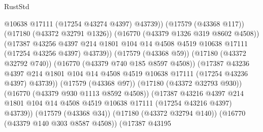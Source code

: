 \begin{lexlean}{RustStd}
\begin{coremodule}
{\begin{coremodule}
{{{{{{{{{{{{{{{{{{{{{{{{{{{{{{{{{{{{{{{{{{{{{{{{{{{{{{{                                      @10638
                                      @17111
                                      (@17254 @43274 @4397)
                                      @43739))
                                  (@17579 (@43368 @117))
                                  (@17180 (@43372 @32791 @1326))
                                  (@16770 (@43379 @1326 @319 @8602 @4508))
                                  (@17387
                                    @43256
                                    @4397
                                    @214
                                    @1801
                                    @104
                                    @14
                                    @4508
                                    @4519
                                    @10638
                                    @17111
                                    (@17254 @43256 @4397)
                                    @43739))
                                (@17579 (@43368 @59))
                                (@17180 (@43372 @32792 @740))
                                (@16770 (@43379 @740 @185 @8597 @4508))
                                (@17387
                                  @43236
                                  @4397
                                  @214
                                  @1801
                                  @104
                                  @14
                                  @4508
                                  @4519
                                  @10638
                                  @17111
                                  (@17254 @43236 @4397)
                                  @43739))
                              (@17579 (@43368 @97))
                              (@17180 (@43372 @32793 @930))
                              (@16770 (@43379 @930 @1113 @8592 @4508))
                              (@17387
                                @43216
                                @4397
                                @214
                                @1801
                                @104
                                @14
                                @4508
                                @4519
                                @10638
                                @17111
                                (@17254 @43216 @4397)
                                @43739))
                            (@17579 (@43368 @34))
                            (@17180 (@43372 @32794 @140))
                            (@16770 (@43379 @140 @303 @8587 @4508))
                            (@17387
                              @43195
}}}}}}}}}}}}}}}}}}}}}}}}}}}}}}}}}}}}}}}}}}}}}}}}}}}}}}}
\end{coremodule}}
\end{coremodule}
\end{lexlean}
